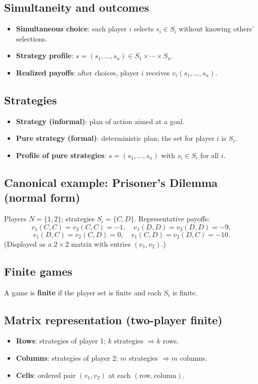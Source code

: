 \documentclass[11pt]{article}
\begin{document}
\begin{multicols}{2}
\subsection*{Simultaneity and outcomes}
\begin{itemize}
  \item \textbf{Simultaneous choice}: each player $i$ selects $s_i\in S_i$ without knowing others’ selections.
  \item \textbf{Strategy profile}: $s=(s_1,\dots,s_n)\in S_1\times\cdots\times S_n$.
  \item \textbf{Realized payoffs}: after choices, player $i$ receives $v_i(s_1,\dots,s_n)$.
\end{itemize}

\subsection*{Strategies}
\begin{itemize}
  \item \textbf{Strategy (informal)}: plan of action aimed at a goal.
  \item \textbf{Pure strategy (formal)}: deterministic plan; the set for player $i$ is $S_i$.
  \item \textbf{Profile of pure strategies}: $s=(s_1,\dots,s_n)$ with $s_i\in S_i$ for all $i$.
\end{itemize}

\subsection*{Canonical example: Prisoner’s Dilemma (normal form)}
Players $N=\{1,2\}$; strategies $S_i=\{C,D\}$.
Representative payoffs:
\[
v_1(C,C)=v_2(C,C)=-1,\quad
v_1(D,D)=v_2(D,D)=-9,
\]
\[
v_1(D,C)=v_2(C,D)=0,\quad
v_1(C,D)=v_2(D,C)=-10.
\]
(Displayed as a $2\times2$ matrix with entries $(v_1,v_2)$.)

\subsection*{Finite games}
A game is \textbf{finite} if the player set is finite and each $S_i$ is finite.

\subsection*{Matrix representation (two-player finite)}
\begin{itemize}
  \item \textbf{Rows}: strategies of player 1; $k$ strategies $\Rightarrow k$ rows.
  \item \textbf{Columns}: strategies of player 2; $m$ strategies $\Rightarrow m$ columns.
  \item \textbf{Cells}: ordered pair $(v_1,v_2)$ at each $(\text{row},\text{column})$.
\end{itemize}


\end{multicols}
\end{document}

